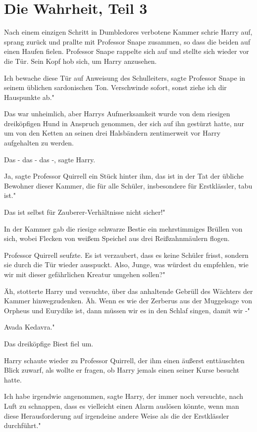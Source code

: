 \chapter{Die Wahrheit, Teil 3}

Nach einem einzigen Schritt in Dumbledores verbotene Kammer schrie Harry auf,
sprang zurück und prallte mit Professor Snape zusammen, so dass die beiden auf
einen Haufen fielen. Professor Snape rappelte sich auf und stellte sich wieder
vor die Tür. Sein Kopf hob sich, um Harry anzusehen.

\glqq{}Ich bewache diese Tür auf Anweisung des Schulleiters\grqq{}, sagte
Professor Snape in seinem üblichen sardonischen Ton. \glqq{}Verschwinde sofort,
sonst ziehe ich dir Hauspunkte ab."

Das war unheimlich, aber Harrys Aufmerksamkeit wurde von dem riesigen
dreiköpfigen Hund in Anspruch genommen, der sich auf ihn gestürzt hatte, nur um
von den Ketten an seinen drei Halsbändern zentimerweit vor Harry aufgehalten zu
werden.

\glqq{}Das - das - das -\grqq{}, sagte Harry.

\glqq{}Ja\grqq{}, sagte Professor Quirrell ein Stück hinter ihm, \glqq{}das ist in
der Tat der übliche Bewohner dieser Kammer, die für alle Schüler, insbesondere
für Erstklässler, tabu ist."

\glqq{}Das ist selbst für Zauberer-Verhältnisse nicht sicher!"

In der Kammer gab die riesige schwarze Bestie ein mehrstimmiges Brüllen von
sich, wobei Flecken von weißem Speichel aus drei Reißzahnmäulern flogen.

Professor Quirrell seufzte. \glqq{}Es ist verzaubert, dass es keine Schüler
frisst, sondern sie durch die Tür wieder ausspuckt. Also, Junge, was würdest du
empfehlen, wie wir mit dieser gefährlichen Kreatur umgehen sollen?"

\glqq{}Äh\grqq{}, stotterte Harry und versuchte, über das anhaltende Gebrüll des
Wächters der Kammer hinwegzudenken. \glqq{}Äh. Wenn es wie der Zerberus aus der
Muggelsage von Orpheus und Eurydike ist, dann müssen wir es in den Schlaf
singen, damit wir -"

\glqq{}Avada Kedavra."

Das dreiköpfige Biest fiel um.

Harry schaute wieder zu Professor Quirrell, der ihm einen äußerst enttäuschten
Blick zuwarf, als wollte er fragen, ob Harry jemals einen seiner Kurse besucht
hatte.

\glqq{}Ich habe irgendwie angenommen\grqq{}, sagte Harry, der immer noch
versuchte, nach Luft zu schnappen, \glqq{}dass es vielleicht einen Alarm auslösen
könnte, wenn man diese Herausforderung auf irgendeine andere Weise als die der
Erstklässler durchführt."

